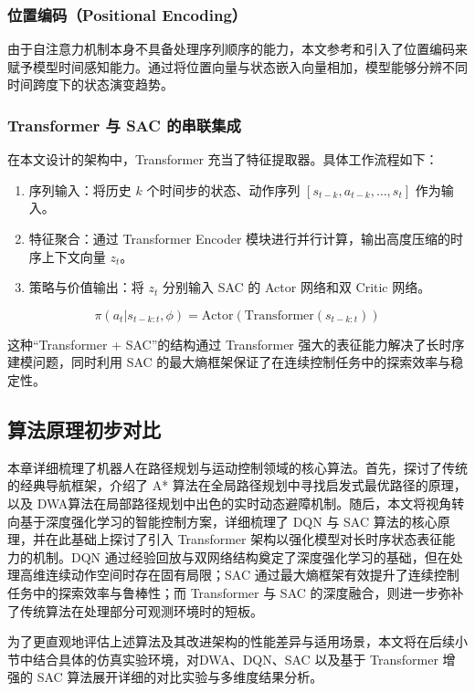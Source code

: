 \subsubsection{位置编码（Positional Encoding）}
由于自注意力机制本身不具备处理序列顺序的能力，本文参考\cite{q-transformer}和\cite{traj-transformer}引入了位置编码来赋予模型时间感知能力。通过将位置向量与状态嵌入向量相加，模型能够分辨不同时间跨度下的状态演变趋势。

\subsubsection{Transformer 与 SAC 的串联集成}
在本文设计的架构中，Transformer 充当了特征提取器。具体工作流程如下：
\begin{enumerate}
    \item 序列输入：将历史 $k$ 个时间步的状态、动作序列 $[s_{t-k}, a_{t-k}, \dots, s_t]$ 作为输入。
    \item 特征聚合：通过 Transformer Encoder 模块进行并行计算，输出高度压缩的时序上下文向量 $z_t$。
    \item 策略与价值输出：将 $z_t$ 分别输入 SAC 的 Actor 网络和双 Critic 网络。
\end{enumerate}

\begin{equation}
    \pi(a_t | s_{t-k:t}, \phi) = \text{Actor}(\text{Transformer}(s_{t-k:t}))
\end{equation}

这种“Transformer + SAC”的结构通过 Transformer 强大的表征能力解决了长时序建模问题，同时利用 SAC 的最大熵框架保证了在连续控制任务中的探索效率与稳定性。

\subsection{算法原理初步对比}
本章详细梳理了机器人在路径规划与运动控制领域的核心算法。首先，探讨了传统的经典导航框架，介绍了 A* 算法在全局路径规划中寻找启发式最优路径的原理，以及 DWA算法在局部路径规划中出色的实时动态避障机制。随后，本文将视角转向基于深度强化学习的智能控制方案，详细梳理了 DQN 与 SAC 算法的核心原理，并在此基础上探讨了引入 Transformer 架构以强化模型对长时序状态表征能力的机制。DQN 通过经验回放与双网络结构奠定了深度强化学习的基础，但在处理高维连续动作空间时存在固有局限；SAC 通过最大熵框架有效提升了连续控制任务中的探索效率与鲁棒性；而 Transformer 与 SAC 的深度融合，则进一步弥补了传统算法在处理部分可观测环境时的短板。

为了更直观地评估上述算法及其改进架构的性能差异与适用场景，本文将在后续小节中结合具体的仿真实验环境，对DWA、DQN、SAC 以及基于 Transformer 增强的 SAC 算法展开详细的对比实验与多维度结果分析。
